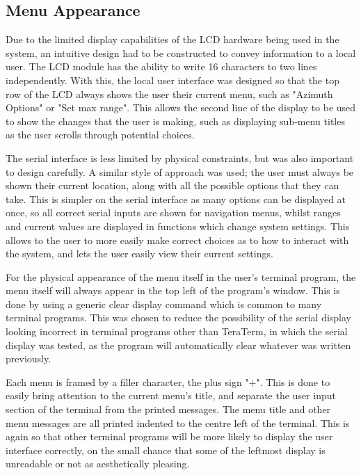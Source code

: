 \documentclass[]{report}
\begin{document}
\subsection{Menu Appearance}
Due to the limited display capabilities of the LCD hardware being used in the system, an intuitive design had to be constructed to convey information to a local user. The LCD module has the ability to write 16 characters to two lines independently. With this, the local user interface was designed so that the top row of the LCD always shows the user their current menu, such as "Azimuth Options" or "Set max range". This allows the second line of the display to be used to show the changes that the user is making, such as displaying sub-menu titles as the user scrolls through potential choices. 

The serial interface is less limited by physical constraints, but was also important to design carefully. A similar style of approach was used; the user must always be shown their current location, along with all the possible options that they can take. This is simpler on the serial interface as many options can be displayed at once, so all correct serial inputs are shown for navigation menus, whilst ranges and current values are displayed in functions which change system settings. This allows to the user to more easily make correct choices as to how to interact with the system, and lets the user easily view their current settings. 

For the physical appearance of the menu itself in the user's terminal program, the menu itself will always appear in the top left of the program's window. This is done by using a generic clear display command which is common to many terminal programs. This was chosen to reduce the possibility of the serial display looking incorrect in terminal programs other than TeraTerm, in which the serial display was tested, as the program will automatically clear whatever was written previously. 

Each menu is framed by a filler character, the plus sign "+". This is done to easily bring attention to the current menu's title, and separate the user input section of the terminal from the printed messages. The menu title and other menu messages are all printed indented to the centre left of the terminal. This is again so that other terminal programs will be more likely to display the user interface correctly, on the small chance that some of the leftmost display is unreadable or not as aesthetically pleasing.  
\end{document}
